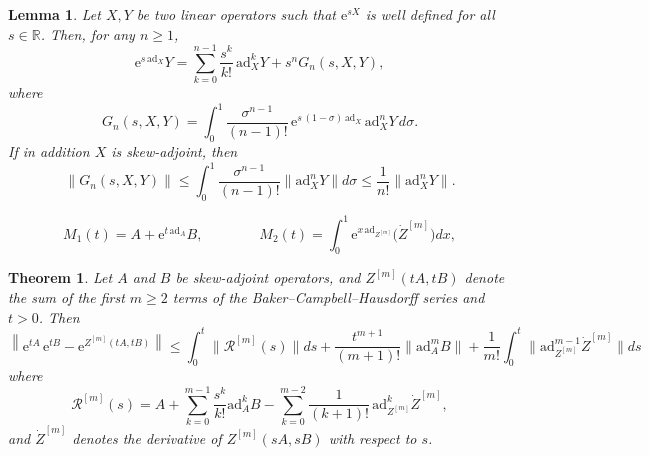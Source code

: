 \documentclass[10pt,a4paper]{amsart}
\newtheorem{lemma}{Lemma}
\newtheorem{theorem}{Theorem}
\newcommand{\ad}{\ensuremath{\mathrm{ad}}}
\newcommand{\e}{\ensuremath{\mathrm{e}}}
\begin{document}
\begin{lemma} \label{l:lemma2}
    Let $X, Y$ be two linear operators such that $\e^{s X}$ is well defined for all $s \in \mathbb R$. Then, for any $n\geq 1$, 
        \[
        \e^{s \, \ad_X} Y = \sum_{k=0}^{n-1} \frac{s^k}{k!} \, \ad_X^{k} Y + s^n G_n\left(s, X, Y\right),
    \]
    where
  \begin{equation}
  \label{eq:Gn}
G_n(s, X,Y) = \int_0^1 \frac{\sigma^{n-1}}{(n-1)!} \, \e^{s \, (1-\sigma)\, \ad_X}\, \ad_X^n Y\, d\sigma.
\end{equation}
If in addition $X$ is skew-adjoint, then
\begin{equation} \label{norm_G}
  \|G_n(s,X,Y)\| \le \int_0^1 \frac{\sigma^{n-1}}{(n-1)!} \|\ad_X^n Y\| d\sigma \le \frac{1}{n!} \|\ad_X^n Y\|.
\end{equation}

\end{lemma}

 \begin{equation} \label{M1M2_trunc}
   M_1(t) = A + \e^{t \, \ad_{A}} B, \qquad\qquad  M_2(t) = \int_0^1 \e^{x \, \ad_{Z^{[m]}}} \big(\dot{Z}^{[m]}\big) dx,
 \end{equation}

\begin{theorem}\label{th:general_bound} 
Let $A$ and $B$ be skew-adjoint operators, and $Z^{[m]}(tA, tB)$ denote the sum of the first $m \ge 2$ 
terms of the Baker--Campbell--Hausdorff series and $t > 0$. Then
\[
   \left\| \e^{t A} \, \e^{t B} - \e^{Z^{[m]}(tA, tB) } \right\| \le \int_0^t \|  \mathcal{R}^{[m]}(s) \| ds + \frac{t^{m+1}}{(m+1)!} \|\ad_A^m B\| + 
   \frac{1}{m!} \int_0^t \|\ad_{Z^{[m]}}^{m-1} \dot{Z}^{[m]} \| ds
\]
where 
\begin{equation} \label{def_R}
    \mathcal{R}^{[m]}(s) = A + \sum_{k=0}^{m-1} \frac{s^k}{k!} \ad_A^k B - \sum_{k=0}^{m-2} \frac{1}{(k+1)!} \, \ad_{Z^{[m]}}^k \dot{Z}^{[m]} ,
\end{equation}
and $ \dot{Z}^{[m]}$ denotes the derivative of $Z^{[m]}(sA,sB)$ with respect to $s$.
\end{theorem}   
\end{document}
